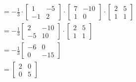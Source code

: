 \documentclass[11pt]{article}
\begin{document}
\begin{enumerate}[{\bf Q1.}]
\begin{enumerate}
$$\begin{aligned}
			& =-\frac{1}{3} \cdot\left[\begin{array}{cc}
			1 & -5 \\
			-1 & 2
			\end{array}\right] \cdot\left[\begin{array}{cc}
			7 & -10 \\
			1 & 0
			\end{array}\right] \cdot\left[\begin{array}{ll}
			2 & 5 \\
			1 & 1
			\end{array}\right] \\
			& =-\frac{1}{3}\left[\begin{array}{cc}
			2 & -10 \\
			-5 & 10
			\end{array}\right] \cdot\left[\begin{array}{ll}
			2 & 5 \\
			1 & 1
			\end{array}\right] \\
			& =-\frac{1}{3}\left[\begin{array}{cc}
			-6 & 0 \\
			0 & -15
			\end{array}\right] \\
			& =\left[\begin{array}{ll}
			2 & 0 \\
			0 & 5
			\end{array}\right] \\
			&
			\end{aligned}
			$$


\end{enumerate}
\end{enumerate}
\end{document}
